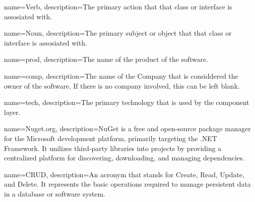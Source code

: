 
{
    name=Verb,
    description={The primary action that that class or interface is assosiated with.}
}

{
    name=Noun,
    description={The primary subject or object that that class or interface is assosiated with.}
}

{
    name=prod,
    description={The name of the product of the software.}
}

{
    name=comp,
    description={The name of the Company that is considdered the owner of the software. If
    there is no company involved, this can be left blank.}
}

{
    name=tech,
    description={The primary technology that is used by the component layer.}
}

{ name=Nuget.org, description={NuGet is a free and open-source package manager for the
    Microsoft development platform, primarily targeting the .NET Framework. It unilizes
    third-party libraries into projects by providing a centralized platform for
    discovering, downloading, and managing dependencies.} }

{ name=CRUD, description={An acronym that stands for Create, Read, Update, and Delete. It
represents the basic operations required to manage persistent data in a database or
software system.} }